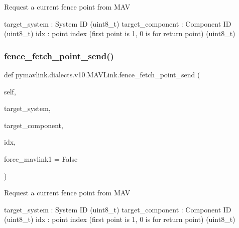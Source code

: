 \begin{DoxyVerb}
\begin{DoxyVerb}
\begin{DoxyVerb}Request a current fence point from MAV

target_system             : System ID (uint8_t)
target_component          : Component ID (uint8_t)
idx                       : point index (first point is 1, 0 is for return point) (uint8_t)\end{DoxyVerb}
 \mbox{\label{classpymavlink_1_1dialects_1_1v10_1_1MAVLink_ab027f982218ab0c6ad2d19b6c62835d1}} 
\subsubsection{\texorpdfstring{fence\+\_\+fetch\+\_\+point\+\_\+send()}{fence\_fetch\_point\_send()}}
{\footnotesize\ttfamily def pymavlink.\+dialects.\+v10.\+M\+A\+V\+Link.\+fence\+\_\+fetch\+\_\+point\+\_\+send (\begin{DoxyParamCaption}\item[{}]{self,  }\item[{}]{target\+\_\+system,  }\item[{}]{target\+\_\+component,  }\item[{}]{idx,  }\item[{}]{force\+\_\+mavlink1 = {\ttfamily False} }\end{DoxyParamCaption})}

\begin{DoxyVerb}Request a current fence point from MAV

target_system             : System ID (uint8_t)
target_component          : Component ID (uint8_t)
idx                       : point index (first point is 1, 0 is for return point) (uint8_t)\end{DoxyVerb}
 \mbox{\label{classpymavlink_1_1dialects_1_1v10_1_1MAVLink_acadee5ae8c23275276e31be7559ee082}} 

\end{DoxyVerb}
\end{DoxyVerb}
